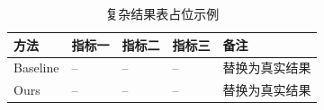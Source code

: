 \begin{table}[htbp]
  \centering
  \caption{复杂结果表占位示例}
  \label{tab:compact-result-example}
  \nbucompacttable
  \begin{tabular}{C{0.20\textwidth}C{0.16\textwidth}C{0.16\textwidth}C{0.16\textwidth}C{0.16\textwidth}}
    \toprule
    方法 & 指标一 & 指标二 & 指标三 & 备注 \\
    \midrule
    Baseline & -- & -- & -- & 替换为真实结果 \\
    Ours & -- & -- & -- & 替换为真实结果 \\
    \bottomrule
  \end{tabular}
\end{table}
